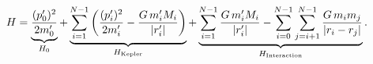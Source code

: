 \documentclass[preview]{standalone}
\begin{document}
\begin{align*}
\special{dvisvgm:raw <g id='unique000'>}H = \underbrace{\frac{(p_0')^{2}}{2 m_0'}}_{H_0} + \underbrace{ \sum_{i=1}^{N-1} \left( \frac{(p_i')^{2}}{2 m_i'} - \frac{G\, m_i' M_i}{\lvert r_i' \rvert} \right) }_{H_{\text{Kepler}}} + \underbrace{ \sum_{i=1}^{N-1} \frac{G\, m_i' M_i}{\lvert r_i' \rvert} - \sum_{i=0}^{N-1} \sum_{j=i+1}^{N-1} \frac{G\, m_i m_j}{\lvert r_i - r_j \rvert} }_{H_{\text{Interaction}}}.\special{dvisvgm:raw </g>}
\end{align*}
\end{document}
